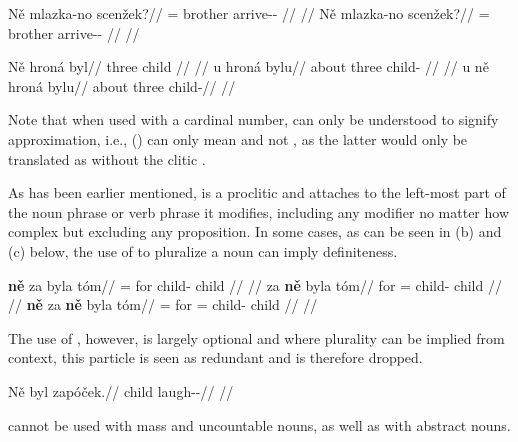 \pex
\begingl
    \gla Ně mlazka-no scenžek?//
    \glb \Hon{}= brother arrive-\Av{}-\Pf{} //
    \glft {}//
\endgl
\xe
\pex
\begingl
    \gla Ně mlazka-no scenžek?//
    \glb \Hon{}= brother arrive-\Av{}-\Pf{} //
    \glft {}//
\endgl
\xe

\pex
\a
\begingl{}
    \gla Ně hroná byl//
    \glb {} three child //
    \glft {}//
\endgl
\a
\begingl
    \gla u hroná bylu//
    \glb about three child-\Ins{} //
    \glft {}//
\endgl
\a
\begingl
    \gla u ně hroná bylu//
    \glb about  three child-\Ins{}//
    \glft {}//
\endgl
\xe

Note that when used with a cardinal number,  can only be understood to signify approximation, i.e., () can only mean  and not , as the latter would only be translated as  without the clitic .

As has been earlier mentioned,  is a proclitic and attaches to the left-most part of the noun phrase or verb phrase it modifies, including any modifier no matter how complex but excluding any proposition. In some cases, as can be seen in (b) and (c) below, the use of  to pluralize a noun can imply definiteness.

\pex
\a
\begingl{}
    \gla \textbf{ně} za byla tóm//
    \glb \Pl{}= for child-\Acc{} child //
    \glft {}//
\endgl
\a
\begingl{}
    \gla za \textbf{ně} byla tóm//
    \glb for \Pl{}= child-\Acc{} child //
    \glft {}//
\endgl
\a
\begingl{}
    \gla \textbf{ně} za \textbf{ně} byla tóm//
    \glb \Pl{}= for \Pl{}= child-\Acc{} child //
    \glft {}//
\endgl
\xe





The use of , however, is largely optional and where plurality can be implied from context, this particle is seen as redundant and is therefore dropped.

\pex
\begingl
\gla Ně byl zapóček.//
\glb \Pl{} child laugh-\Av{}-\Pf{}//
\glft {}//
\endgl
\xe

 cannot be used with mass and uncountable nouns, as well as with abstract nouns.

